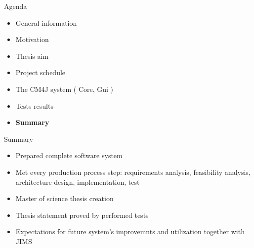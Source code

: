 \documentclass{beamer}
\begin{document}
	\begin{frame}{Agenda}

		\begin{itemize}
			\item General information
			\item Motivation
			\item Thesis aim
			\item Project schedule
			\item The CM4J system ( Core, Gui )
			\item Tests results
			\item \textbf{Summary}
		\end{itemize}

	\end{frame}

	\begin{frame}{Summary}

		
		\begin{itemize}
			\item Prepared complete software system 
			\item Met every production process step: requirements analysis, feasibility analysis, architecture design, implementation, test
			\item Master of science thesis creation
			\item Thesis statement proved by performed tests
			\item Expectations for future system's improvemnts and utilization together with JIMS
		\end{itemize}

	\end{frame}
\end{document}
